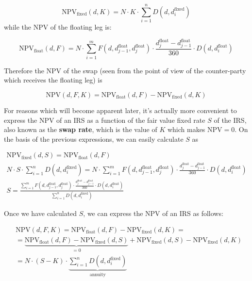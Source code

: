 \begin{equation}
\mathrm{NPV}_{\mathrm{fixed}}(d, K) = N\cdot K\cdot\sum_{i=1}^{n}D(d, d_{i}^{\mathrm{fixed}})
\end{equation}
while the NPV of the floating leg is:

\begin{equation}
\mathrm{NPV}_{\mathrm{float}}(d, F) = N\cdot\sum_{i=1}^{m}F(d, d_{j-1}^{\mathrm{float}}, d_{j}^{\mathrm{float}}) \cdot \frac{d_{j}^{\mathrm{float}}-d_{j-1}^{\mathrm{float}}}{360}
\cdot D(d, d_{i}^{\mathrm{float}})
\end{equation}

Therefore the NPV of the swap (seen from the point of view of the counter-party which receives the floating leg) is

\begin{equation}
\mathrm{NPV}(d, F, K) = \mathrm{NPV}_{\mathrm{float}}(d, F) - \mathrm{NPV}_{\mathrm{fixed}}(d, K)
\label{eq:irs_npv}
\end{equation}

For reasons which will become apparent later, it's actually more convenient to express the NPV of an IRS as a function of the fair value fixed rate $S$ of the IRS, also known as the \textbf{swap rate}, which is the value of $K$ which makes $\mathrm{NPV}=0$. On the basis of the previous expressions, we can easily calculate $S$ as

\begin{equation}
\begin{gathered}
\mathrm{NPV}_{\mathrm{fixed}}(d, S) = \mathrm{NPV}_{\mathrm{float}}(d, F)\\[5pt]
N\cdot S\cdot\sum_{i=1}^{n}D(d, d_{i}^{\mathrm{fixed}}) = N\cdot\sum_{i=1}^{m}F(d, d_{j-1}^{\mathrm{float}}, d_{j}^{\mathrm{float}}) \cdot \frac{d_{j}^{\mathrm{float}}-d_{j-1}^{\mathrm{float}}}{360} \cdot D(d, d_{i}^{\mathrm{float}})\\[5pt]
S=\frac{\sum_{i=1}^{m}F(d, d_{j-1}^{\mathrm{float}}, d_{j}^{\mathrm{float}}) \cdot \frac{d_{j}^{\mathrm{float}}-d_{j-1}^{\mathrm{float}}}{360}
\cdot D(d, d_{i}^{\mathrm{float}})}{\sum_{i=1}^{n}D(d, d_i^{\mathrm{fixed}})}
\end{gathered}
\end{equation}

Once we have calculated $S$, we can express the $\mathrm{NPV}$ of an IRS as follows:

\begin{equation}
\begin{split}&\mathrm{NPV}(d, F, K) = \mathrm{NPV}_{\mathrm{float}}(d, F) - \mathrm{NPV}_{\mathrm{fixed}}(d, K) = \\ 
&= \underbrace{\mathrm{NPV}_{\mathrm{float}}(d, F) - \mathrm{NPV}_{\mathrm{fixed}}(d, S)}_{\textstyle\mathrm{=0}} + \mathrm{NPV}_{\mathrm{fixed}}(d, S) - \mathrm{NPV}_{\mathrm{fixed}}(d, K) \\ 
& = N\cdot(S-K)\cdot\underbrace{\sum_{i=1}^{n}D(d, d_{i}^{\mathrm{fixed}})}_{\textstyle \mathrm{annuity}}
\end{split}
\label{eq:irs_npv2}
\end{equation}

